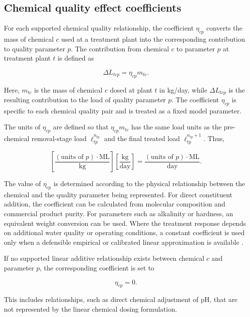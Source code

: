 \documentclass[10pt]{article}
\begin{document}
\subsection{Chemical quality effect coefficients}

For each supported chemical quality relationship, the coefficient $\eta_{cp}$ converts the mass of chemical $c$ used at a treatment plant into the corresponding contribution to quality parameter $p$. The contribution from chemical $c$ to parameter $p$ at treatment plant $t$ is defined as

\begin{equation}\label{eq:chemical_quality_effect}
\Delta L_{tcp}
=
\eta_{cp} m_{tc}.
\end{equation}

Here, $m_{tc}$ is the mass of chemical $c$ dosed at plant $t$ in kg/day, while $\Delta L_{tcp}$ is the resulting contribution to the load of quality parameter $p$. The coefficient $\eta_{cp}$ is specific to each chemical quality pair and is treated as a fixed model parameter.

The units of $\eta_{cp}$ are defined so that $\eta_{cp}m_{tc}$ has the same load units as the pre-chemical removal-stage load $\ell^{n_{tp}}_{tp}$ and the final treated load $\ell^{n_{tp}+1}_{tp}$. Thus,

\[
\left[
\frac{(\text{units of }p)\cdot\text{ML}}
{\text{kg}}
\right]
\left[
\frac{\text{kg}}{\text{day}}
\right]
=
\frac{(\text{units of }p)\cdot\text{ML}}
{\text{day}}.
\]

The value of $\eta_{cp}$ is determined according to the physical relationship between the chemical and the quality parameter being represented. For direct constituent addition, the coefficient can be calculated from molecular composition and commercial product purity. For parameters such as alkalinity or hardness, an equivalent weight conversion can be used. Where the treatment response depends on additional water quality or operating conditions, a constant coefficient is used only when a defensible empirical or calibrated linear approximation is available \cite{Huang2025CoagulantDosing}.

If no supported linear additive relationship exists between chemical $c$ and parameter $p$, the corresponding coefficient is set to

\[
\eta_{cp}=0.
\]

This includes relationships, such as direct chemical adjustment of pH, that are not represented by the linear chemical dosing formulation.
\end{document}
